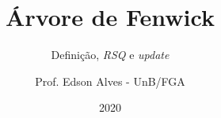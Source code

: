 \title{Árvore de Fenwick}
\subtitle{Definição, \textit{RSQ} e \textit{update}}
\author{Prof. Edson Alves - UnB/FGA}
\date{2020}
